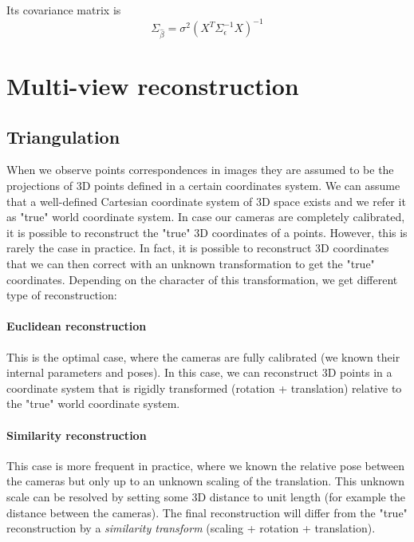 Its covariance matrix is 
\begin{equation}
   \Sigma_{\hat{\beta}} = \sigma^2 (X^T \Sigma_{\epsilon}^{-1} X)^{-1}
\end{equation}


\section{Multi-view reconstruction}

\subsection{Triangulation}

When we observe points correspondences in images they are assumed to be the projections of 3D points defined in a certain coordinates system. We can assume that a well-defined Cartesian coordinate system of 3D space exists and we refer it as "true" world coordinate system. 
In case our cameras are completely calibrated, it is possible to reconstruct the "true" 3D coordinates of a points. However, this is rarely the case in practice. In fact, it is possible to reconstruct 3D coordinates that we can then correct with an unknown transformation to get the "true" coordinates. Depending on the character of this transformation, we get different type of reconstruction:

\paragraph{Euclidean reconstruction}
This is the optimal case, where the cameras are fully calibrated (we known their internal parameters and poses). In this case, we can reconstruct 3D points in a coordinate system that is rigidly transformed (rotation + translation) relative to the "true" world coordinate system.

\paragraph{Similarity reconstruction}
This case is more frequent in practice, where we known the relative pose between the cameras but only up to an unknown scaling of the translation. This unknown scale can be resolved by setting some 3D distance to unit length (for example the distance between the cameras).
The final reconstruction will differ from the "true" reconstruction by a \textit{similarity transform} (scaling + rotation + translation).

